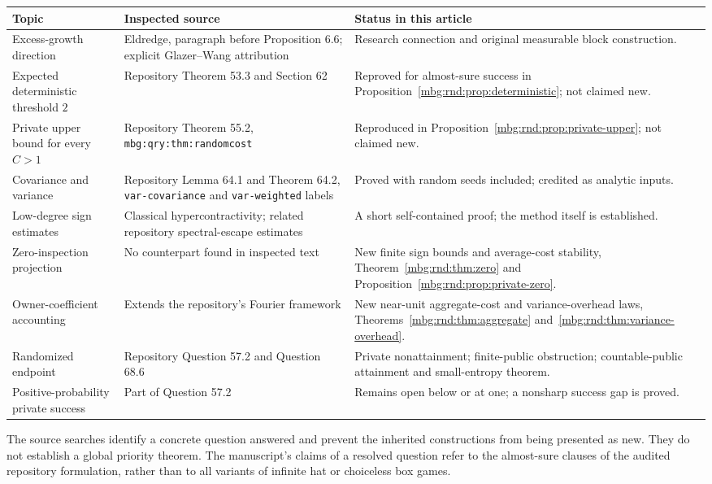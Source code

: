 \documentclass[11pt,letterpaper]{article}
\theoremstyle{definition}
\begin{document}
\begin{longtable}{@{}>{\raggedright\arraybackslash}p{}
>{\raggedright\arraybackslash}p{}
>{\raggedright\arraybackslash}p{}@{}}
\toprule
Topic & Inspected source & Status in this article\\
\midrule
\endhead
Excess-growth direction & Eldredge, paragraph before Proposition 6.6;
explicit Glazer--Wang attribution & Research connection and original
measurable block construction.\\[4pt]
Expected deterministic threshold $2$ & Repository Theorem 53.3 and
Section 62 & Reproved for almost-sure success in
Proposition~\ref{mbg:rnd:prop:deterministic}; not claimed new.\\[4pt]
Private upper bound for every $C>1$ & Repository Theorem 55.2,
\texttt{mbg:qry:thm:randomcost} & Reproduced in
Proposition~\ref{mbg:rnd:prop:private-upper}; not claimed new.\\[4pt]
Covariance and variance & Repository Lemma 64.1 and Theorem 64.2,
\texttt{var-covariance} and \texttt{var-weighted} labels & Proved with
random seeds included; credited as analytic inputs.\\[4pt]
Low-degree sign estimates & Classical hypercontractivity; related
repository spectral-escape estimates & A short self-contained proof;
the method itself is established.\\[4pt]
Zero-inspection projection & No counterpart found in inspected text &
New finite sign bounds and average-cost stability,
Theorem~\ref{mbg:rnd:thm:zero} and Proposition~\ref{mbg:rnd:prop:private-zero}.\\[4pt]
Owner-coefficient accounting & Extends the repository's Fourier
framework & New near-unit aggregate-cost and variance-overhead laws,
Theorems~\ref{mbg:rnd:thm:aggregate} and~\ref{mbg:rnd:thm:variance-overhead}.\\[4pt]
Randomized endpoint & Repository Question 57.2 and Question 68.6 &
Private nonattainment; finite-public obstruction; countable-public
attainment and small-entropy theorem.\\[4pt]
Positive-probability private success & Part of Question 57.2 & Remains
open below or at one; a nonsharp success gap is proved.\\
\bottomrule
\end{longtable}

The source searches identify a concrete question answered and prevent
the inherited constructions from being presented as new. They do not
establish a global priority theorem. The manuscript's claims of a
resolved question refer to the almost-sure clauses of the audited
repository formulation, rather than to all variants of infinite hat
or choiceless box games.
\end{document}
